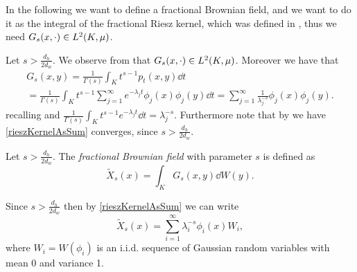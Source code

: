 In the following we want to define a fractional Brownian field, and we want to do it as the integral of the fractional Riesz kernel, which was defined in , thus we need $G_s(x, \cdot ) \in L^{2}(K, \mu)$. 

Let $s > \frac{d_h}{2d_w}$. We observe from  that $G_s(x, \cdot ) \in L^{2}(K, \mu)$. Moreover we have that
	\begin{multline}\label{rieszKernelAsSum}
		G_s(x,y) = \frac{1}{\Gamma(s)}\int_{K} t^{s-1}p_t(x,y)\dd t\\ 
		= \frac{1}{\Gamma(s)}\int_{K} t^{s-1}\sum_{j = 1}^{\infty} e^{-\lambda_j t} \phi_j(x)\phi_j(y)\dd t = \sum_{j = 1}^{\infty} \frac{1}{\lambda_j^{-s}} \phi_j(x)\phi_j(y).
	\end{multline}
	recalling  and $\frac{1}{\Gamma(s)}\int_{K} t^{s-1} e^{-\lambda_jt} \dd t = \lambda_j^{-s}$. Furthermore note that by  we have \eqref{rieszKernelAsSum} converges, since $s > \frac{d_h}{2d_w}$.

\begin{defi}
	Let $s > \frac{d_h}{2d_w}$. The \emph{fractional Brownian field} with parameter $s$ is defined as 
	\begin{equation}
		\widetilde{X}_s(x) = \int_{K} G_s(x,y)\dd W (y).
	\end{equation}
\end{defi}


\begin{remark}
	Since $s > \frac{d_h}{2d_w}$ then by \eqref{rieszKernelAsSum} we can write
	\begin{equation}
		\widetilde{X}_s(x) = \sum_{i = 1}^{\infty} \lambda_i^{-s}\phi_i(x)W_i,
	\end{equation}
	where $W_i = W(\phi_i)$ is an i.i.d. sequence of Gaussian random variables with mean 0 and variance 1.
\end{remark}

